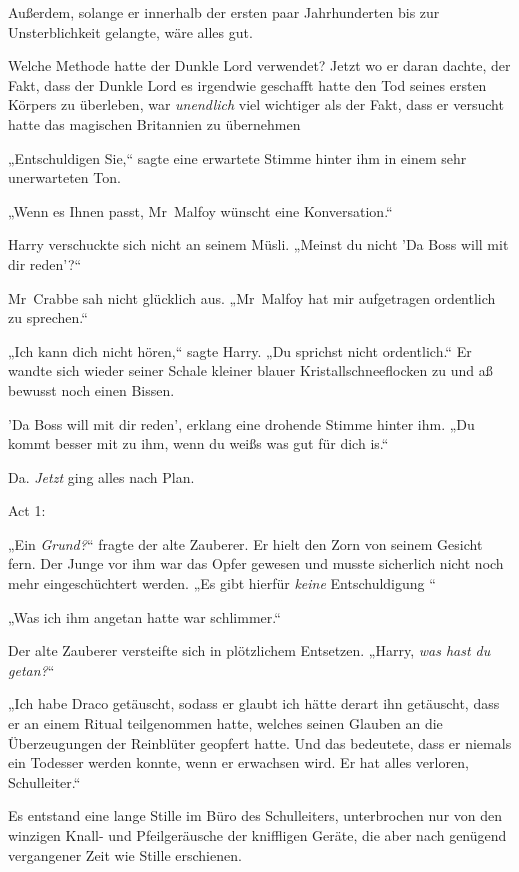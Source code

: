 {Außerdem, solange er innerhalb der ersten paar Jahrhunderten bis zur Unsterblichkeit gelangte, wäre alles gut.

Welche Methode hatte der Dunkle Lord verwendet? Jetzt wo er daran dachte, der Fakt, dass der Dunkle Lord es irgendwie geschafft hatte den Tod seines ersten Körpers zu überleben, war \emph{unendlich} viel wichtiger als der Fakt, dass er versucht hatte das magischen Britannien zu übernehmen \later

„Entschuldigen Sie,“ sagte eine erwartete Stimme hinter ihm in einem sehr unerwarteten Ton.

„Wenn es Ihnen passt, Mr~Malfoy wünscht eine Konversation.“

Harry verschuckte sich nicht an seinem Müsli. „Meinst du nicht 'Da Boss will mit dir reden'?“

Mr~Crabbe sah nicht glücklich aus. „Mr~Malfoy hat mir aufgetragen ordentlich zu sprechen.“

„Ich kann dich nicht hören,“ sagte Harry. „Du sprichst nicht ordentlich.“ Er wandte sich wieder seiner Schale kleiner blauer Kristallschneeflocken zu und aß bewusst noch einen Bissen.

'Da Boss will mit dir reden', erklang eine drohende Stimme hinter ihm. „Du kommt besser mit zu ihm, wenn du weißs was gut für dich is.“

Da. \emph{Jetzt} ging alles nach Plan.

Act 1:

„Ein \emph{Grund?}“ fragte der alte Zauberer. Er hielt den Zorn von seinem Gesicht fern. Der Junge vor ihm war das Opfer gewesen und musste sicherlich nicht noch mehr eingeschüchtert werden. „Es gibt hierfür \emph{keine} Entschuldigung \later“

„Was ich ihm angetan hatte war schlimmer.“

Der alte Zauberer versteifte sich in plötzlichem Entsetzen. „Harry, \emph{was hast du getan?}“

„Ich habe Draco getäuscht, sodass er glaubt ich hätte derart ihn getäuscht, dass er an einem Ritual teilgenommen hatte, welches seinen Glauben an die Überzeugungen der Reinblüter geopfert hatte. Und das bedeutete, dass er niemals ein Todesser werden konnte, wenn er erwachsen wird. Er hat alles verloren, Schulleiter.“

Es entstand eine lange Stille im Büro des Schulleiters, unterbrochen nur von den winzigen Knall- und Pfeilgeräusche der kniffligen Geräte, die aber nach genügend vergangener Zeit wie Stille erschienen.

}
